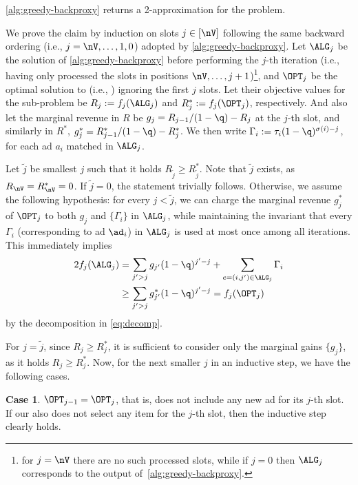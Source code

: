\begin{theoremE}\label{thm:greedy-streamads}
	\cref{alg:greedy-backproxy} returns a 2-approximation for the \streamads problem.
\end{theoremE}
\begin{proofE}
	We prove the claim by induction on slots $j\in[\nV]$ following the same backward ordering (i.e., $j=\nV,\dots, 1,0$) adopted by \cref{alg:greedy-backproxy}. 
	Let $\ALG_j$ be the 
	solution of \cref{alg:greedy-backproxy} before
	performing the $j$-th iteration
	(i.e., having only processed the slots in positions $\nV,\dots, j+1$)\footnote{for $j=\nV$ there are no such processed slots, while if $j=0$ then $\ALG_j$ corresponds to the output of~\cref{alg:greedy-backproxy}.}, and 
	$\OPT_j$ be the optimal solution to \streamads (i.e., \OPT) ignoring the first $j$ slots.
	Let their objective values for the sub-problem \streamadsj be $R_j := f_j(\ALG_j)$ and $R_j^* := f_j(\OPT_j)$, respectively.
	And also let the marginal revenue in $R$ be $g_j = R_{j-1} / (1-\q) - R_j$ at the $j$-th slot, and similarly in $R^*$, $g^*_j = R^*_{j-1} / (1-\q) - R_j^*$.
	We then write $\Gamma_i := \tau_i (1-\q)^{\sigma(i)-j}$,
	for each ad $a_i$ matched in $\ALG_j$.
	
	Let $\tilde{j}$ be smallest $j$ such that it holds
	$R_{\tilde{j}} \ge R_{\tilde{j}}^*$.
	Note that $\tilde{j}$ exists, as $R_\nV = R_\nV^* = 0$.
	If $\tilde{j} = 0$, 
	the statement trivially follows.
	Otherwise, we assume the following hypothesis:
	for every $j < \tilde{j}$,
	we can charge the marginal revenue 
	$g^*_j$ of $\OPT_j$ to both $g_j$ and $\{ \Gamma_i \}$ in $\ALG_j$,
	while maintaining the invariant that
	every $\Gamma_i$ (corresponding to ad $\ad_i$) in $\ALG_j$ is used at most once among all iterations.
	This immediately implies
	\begin{align*}
		2 f_j(\ALG_j) &=  \sum_{j' > j} g_{j'} (1-\q)^{j'-j} + \sum_{e=(i,j') \in \ALG_j}  \Gamma_{i} \\
		&\ge \sum_{j' > j} g^*_{j'} (1-\q)^{j'-j}
		= f_j(\OPT_j)
	\end{align*}
	by the decomposition in \cref{eq:decomp}.
	
	For $j = \tilde{j}$, 
	since $R_j \ge R_j^*$,
	it is sufficient to consider only the marginal gains
	$\{ g_j \}$, as it holds $R_j \ge R_j^*$.
	Now, for the next smaller $j$ in an inductive step, we have the following cases.
	
	\textbf{Case 1}. $\OPT_{j-1} = \OPT_{j}$, that is, \OPT does not include any new ad for its $j$-th slot.
	If our \ALG also does not select any item for the $j$-th slot, then the inductive step clearly holds.
	

\end{proofE}
